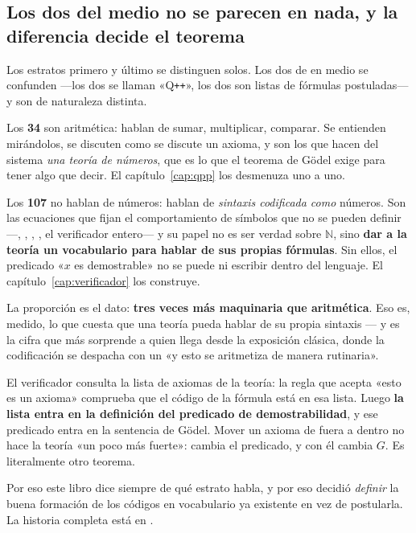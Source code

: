 \subsection*{Los dos del medio no se parecen en nada, y la diferencia decide el teorema}

Los estratos primero y último se distinguen solos. Los dos de en medio se confunden —los dos se
llaman «Q\texttt{++}», los dos son listas de fórmulas postuladas— y son de naturaleza distinta.

Los \textbf{34} son aritmética: hablan de sumar, multiplicar, comparar. Se entienden mirándolos, se
discuten como se discute un axioma, y son los que hacen del sistema \emph{una teoría de números},
que es lo que el teorema de Gödel exige para tener algo que decir. El
capítulo~\ref{cap:qpp} los desmenuza uno a uno.

Los \textbf{107} no hablan de números: hablan de \emph{sintaxis codificada como} números. Son las
ecuaciones que fijan el comportamiento de símbolos que no se pueden definir —,
, , , el verificador entero— y su papel no es ser verdad sobre
$\mathbb{N}$, sino \textbf{dar a la teoría un vocabulario para hablar de sus propias fórmulas}. Sin
ellos, el predicado «$x$ es demostrable» no se puede ni escribir dentro del lenguaje. El
capítulo~\ref{cap:verificador} los construye.

\begin{observacion}
La proporción es el dato: \textbf{tres veces más maquinaria que aritmética}. Eso es, medido, lo que
cuesta que una teoría pueda hablar de su propia sintaxis — y es la cifra que más sorprende a quien
llega desde la exposición clásica, donde la codificación se despacha con un «y esto se aritmetiza
de manera rutinaria».
\end{observacion}

\begin{muro}
El verificador consulta la lista de axiomas de la teoría: la regla que acepta «esto es un axioma»
comprueba que el código de la fórmula está en esa lista. Luego \textbf{la lista entra en la
definición del predicado de demostrabilidad}, y ese predicado entra en la sentencia de Gödel. Mover
un axioma de fuera a dentro no hace la teoría «un poco más fuerte»: cambia el predicado, y con él
cambia $G$. Es literalmente otro teorema.

Por eso este libro dice siempre de qué estrato habla, y por eso  decidió \emph{definir}
la buena formación de los códigos en vocabulario ya existente en vez de postularla. La historia
completa está en .
\end{muro}

